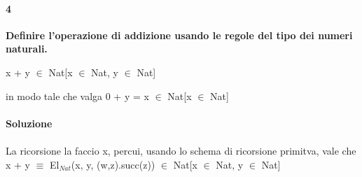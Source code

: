 \paragraph{4}
\textbf{Definire l'operazione di addizione usando le regole del tipo dei numeri naturali.}
\begin{center} x + y $\in$ Nat[x $\in$ Nat, y $\in$ Nat]\end{center}
in modo tale che valga 0 + y = x $\in$  Nat[x $\in$ Nat]
\\\\
\textbf{Soluzione}\\\\
La ricorsione la faccio x, percui, usando lo schema di ricorsione primitva, vale che x + y $\equiv$ El$_{Nat}$(x, y, (w,z).succ(z)) $\in$ Nat[x $\in$ Nat, y $\in$ Nat]

